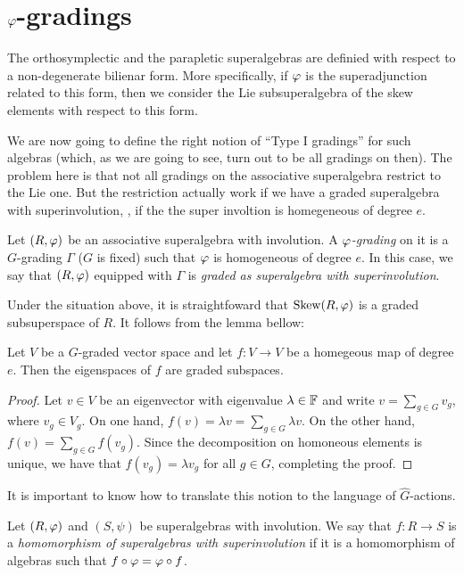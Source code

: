 \documentclass{amsbook}
\begin{document}
\chapter{$\varphi$-gradings}

The orthosymplectic and the parapletic superalgebras are definied with respect to a non-degenerate bilienar form. More specifically, if $\varphi$ is the superadjunction related to this form, then we consider the Lie subsuperalgebra of the skew elements with respect to this form.

We are now going to define the right notion of ``Type I gradings'' for such algebras (which, as we are going to see, turn out to be all gradings on then). The problem here is that not all gradings on the associative superalgebra restrict to the Lie one. But the restriction actually work if we have a graded superalgebra with superinvolution, \ie, if the the super involtion is homegeneous of degree $e$.

\begin{defi}
    Let $(R, \varphi)$ be an associative superalgebra with involution. A \emph{$\varphi$-grading} on it is a $G$-grading $\Gamma$ ($G$ is fixed) such that $\varphi$ is homogeneous of degree $e$. In this case, we say that $(R, \varphi)$ equipped with $\Gamma$ is \emph{graded as superalgebra with superinvolution}.
\end{defi}

Under the situation above, it is straightfoward that $\operatorname{Skew} (R, \varphi)$ is a graded subsuperspace of $R$. It follows from the lemma bellow:

\begin{lemma}
    Let $V$ be a $G$-graded vector space and let $f: V \to V$ be a homegeous map of degree $e$. Then the eigenspaces of $f$ are graded subspaces.
\end{lemma}

\begin{proof}
    Let $v\in V$ be an eigenvector with eigenvalue $\lambda \in \mathbb{F}$ and write $v = \sum_{g\in G} v_g$, where $v_g \in V_g$. On one hand, $f(v) = \lambda v = \sum_{g\in G} \lambda v$. On the other hand, $f(v) = \sum_{g\in G} f(v_g)$. Since the decomposition on homoneous elements is unique, we have that $f(v_g) = \lambda v_g$ for all $g\in G$, completing the proof.
\end{proof}

It is important to know how to translate this notion to the language of $\widehat G$-actions.

\begin{defi}
    Let $(R,\varphi)$ and $(S, \psi)$ be superalgebras with involution. We say that $f: R \to S$ is a \emph{homomorphism of superalgebras with superinvolution} if it is a homomorphism of algebras such that $f\circ \varphi = \varphi \circ f$.
\end{defi}
\end{document}
